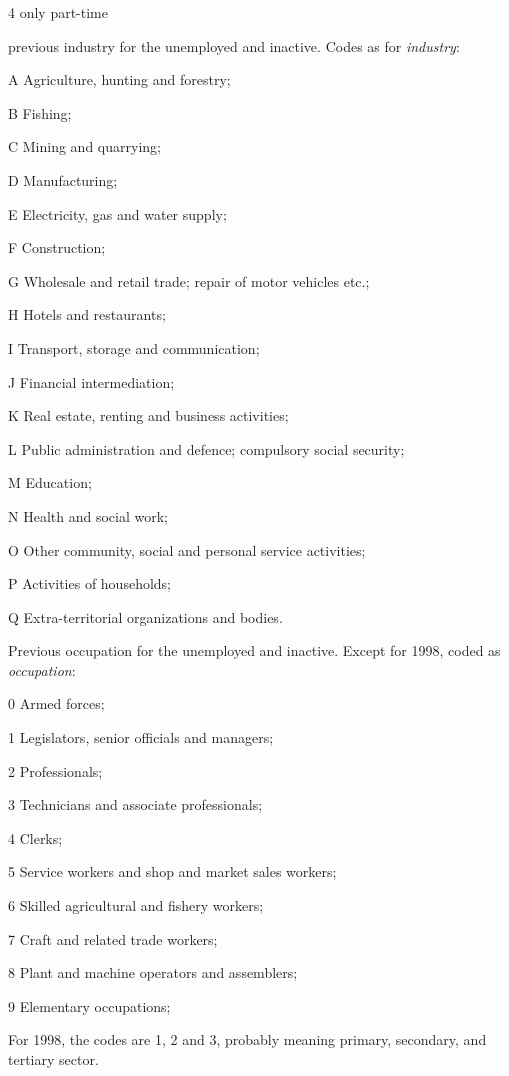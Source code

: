\documentclass[a4paper]{article}
\begin{document}
\begin{description}
\begin{inparaitem}
  \item[4] only part-time
  \end{inparaitem}
\item[prevIndustry] previous industry for the unemployed and
  inactive.  Codes as for \emph{industry}:
  \begin{inparaitem}
  \item[A] Agriculture, hunting and forestry;
  \item[B] Fishing;
  \item[C] Mining and quarrying;
  \item[D] Manufacturing;
  \item[E] Electricity, gas and water supply;
  \item[F] Construction;
  \item[G] Wholesale and retail trade; repair of motor vehicles etc.;
  \item[H] Hotels and restaurants;
  \item[I] Transport, storage and communication;
  \item[J] Financial intermediation;
  \item[K] Real estate, renting and business activities;
  \item[L] Public administration and defence; compulsory social security;
  \item[M] Education;
  \item[N] Health and social work;
  \item[O] Other community, social and personal service activities;
  \item[P] Activities of households;
  \item[Q] Extra-territorial organizations and bodies.
  \end{inparaitem}
\item[prevOccupation] Previous occupation for the unemployed and
  inactive.  Except for 1998, coded as \emph{occupation}:
  \begin{inparaitem}
  \item[0] Armed forces;
  \item[1] Legislators, senior officials and managers;
  \item[2] Professionals;
  \item[3] Technicians and associate professionals;
  \item[4] Clerks;
  \item[5] Service workers and shop and market sales workers;
  \item[6] Skilled agricultural and fishery workers;
  \item[7] Craft and related trade workers;
  \item[8] Plant and machine operators and assemblers;
  \item[9] Elementary occupations;
  \end{inparaitem}

  For 1998, the codes are 1, 2 and 3, probably meaning primary,
  secondary, and tertiary sector.
\end{description}
\end{document}
